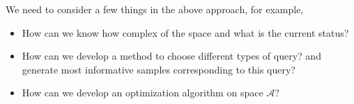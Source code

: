 \documentclass[12pt]{article}
\def\cal{\mathcal}
\def\calA{{\cal A}} %
\begin{document}
We need to consider a few things in the above approach, for example, 
\begin{itemize}
	\item How can we know how complex of the space  and what is the current status?
	\item How can we develop a method to choose different types of query? and generate most informative samples corresponding to this query?
	\item How can we develop an optimization algorithm on space $\calA$? 
\end{itemize}




\end{document}
